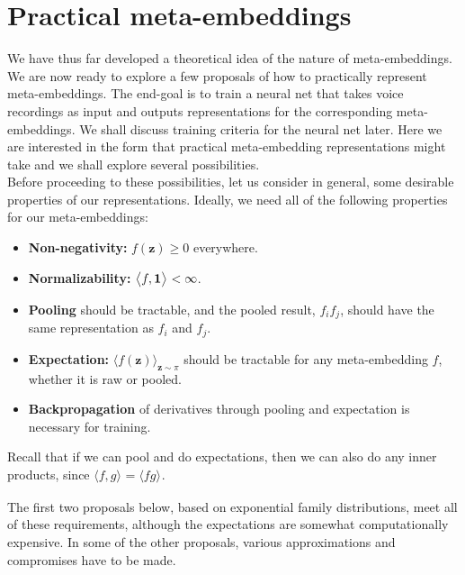 \documentclass[a4paper,oneside,12pt,english]{report}
\def\zvec{\mathbf{z}}
\def\expv#1#2{\bigl\langle#1\bigr\rangle_{#2}}
\def\dot#1#2{\expv{#1,#2}{}}
\begin{document}
\chapter{Practical meta-embeddings}
We have thus far developed a theoretical idea of the nature of meta-embeddings. We are now ready to explore a few proposals of how to practically represent meta-embeddings. The end-goal is to train a neural net that takes voice recordings as input and outputs  representations for the corresponding meta-embeddings. We shall discuss training criteria for the neural net later. Here we are interested in the form that practical meta-embedding representations might take and we shall explore several possibilities. \\

\noindent Before proceeding to these possibilities, let us consider in general, some desirable properties of our representations. Ideally, we need all of the following properties for our meta-embeddings:
\begin{itemize}
	\item[] \textbf{Non-negativity:} $f(\zvec)\ge0$ everywhere.
	\item[] \textbf{Normalizability:} $\dot{f}{\onevec}<\infty$.
	\item[] \textbf{Pooling} should be tractable, and the pooled result, $f_if_j$, should have the same representation as $f_i$ and $f_j$.
	\item[] \textbf{Expectation:}  $\expv{f(\zvec)}{\zvec\sim\pi}$ should be tractable for any meta-embedding $f$, whether it is raw or pooled.
	\item[] \textbf{Backpropagation} of derivatives through pooling and expectation is necessary for training.
\end{itemize}
Recall that if we can pool and do expectations, then we can also do any inner products, since $\dot{f}{g}=\expv{fg}{}$.

The first two proposals below, based on exponential family distributions, meet all of these requirements, although the expectations are somewhat computationally expensive. In some of the other proposals, various approximations and compromises have to be made.
\end{document}
